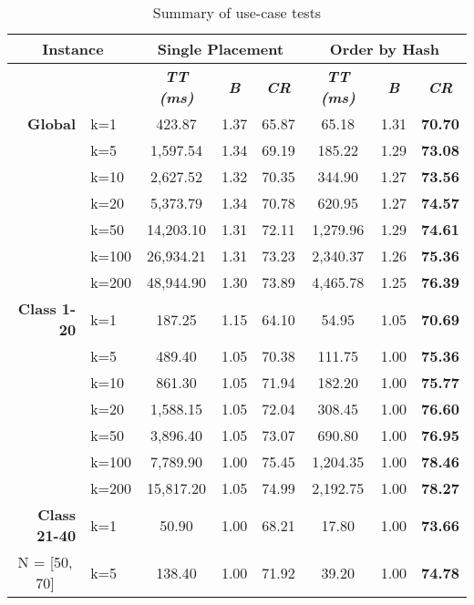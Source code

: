 \begin{table}[htbp]
    \centering
    \caption{Summary of use-case tests}
    \begin{tabular}{|l|l|c|c|c|c|c|c|}
    \hline
    \multicolumn{ 2}{|c|}{\textbf{Instance}} & \multicolumn{ 3}{c|}{\textbf{Single Placement}} & \multicolumn{ 3}{c|}{\textbf{Order by Hash}} \\ \hline
    \multicolumn{ 2}{|l|}{} & \textbf{\textit{TT (ms)}} & \textbf{\textit{B}} & \textbf{\textit{CR}} & \textbf{\textit{TT (ms)}} & \textbf{\textit{B}} & \textbf{\textit{CR}} \\ \hline
    \multicolumn{1}{|r|}{\textbf{Global}} & k=1 & 423.87 & 1.37 & 65.87 & 65.18 & 1.31 & \textbf{70.70} \\ 
     & k=5 & 1,597.54 & 1.34 & 69.19 & 185.22 & 1.29 & \textbf{73.08} \\ 
     & k=10 & 2,627.52 & 1.32 & 70.35 & 344.90 & 1.27 & \textbf{73.56} \\ 
     & k=20 & 5,373.79 & 1.34 & 70.78 & 620.95 & 1.27 & \textbf{74.57} \\ 
     & k=50 & 14,203.10 & 1.31 & 72.11 & 1,279.96 & 1.29 & \textbf{74.61} \\ 
     & k=100 & 26,934.21 & 1.31 & 73.23 & 2,340.37 & 1.26 & \textbf{75.36} \\ 
     & k=200 & 48,944.90 & 1.30 & 73.89 & 4,465.78 & 1.25 & \textbf{76.39} \\ \hline
    \multicolumn{1}{|r|}{\textbf{Class 1-20}} & k=1 & 187.25 & 1.15 & 64.10 & 54.95 & 1.05 & \textbf{70.69} \\ 
     & k=5 & 489.40 & 1.05 & 70.38 & 111.75 & 1.00 & \textbf{75.36} \\ 
     & k=10 & 861.30 & 1.05 & 71.94 & 182.20 & 1.00 & \textbf{75.77} \\ 
     & k=20 & 1,588.15 & 1.05 & 72.04 & 308.45 & 1.00 & \textbf{76.60} \\ 
     & k=50 & 3,896.40 & 1.05 & 73.07 & 690.80 & 1.00 & \textbf{76.95} \\ 
     & k=100 & 7,789.90 & 1.00 & 75.45 & 1,204.35 & 1.00 & \textbf{78.46} \\ 
     & k=200 & 15,817.20 & 1.05 & 74.99 & 2,192.75 & 1.00 & \textbf{78.27} \\ \hline
    \multicolumn{1}{|r|}{\textbf{Class 21-40}} & k=1 & 50.90 & 1.00 & 68.21 & 17.80 & 1.00 & \textbf{73.66} \\ 
    \multicolumn{1}{|c|}{N = [50, 70]} & k=5 & 138.40 & 1.00 & 71.92 & 39.20 & 1.00 & \textbf{74.78} \\ 

\end{tabular}
\end{table}
